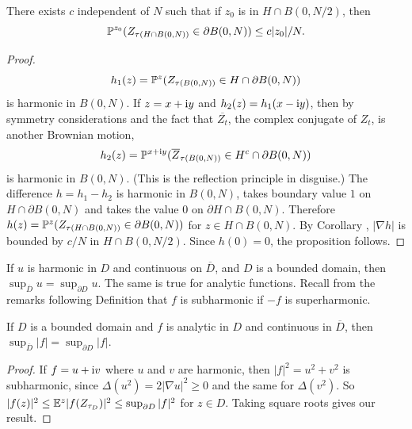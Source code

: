 \begin{proposition}\label{prop:ch5_1.5}
There exists $c$ independent of $N$ such that if $z_0$ is in $H \cap B(0,N/2)$, then
\[
    \P^{z_0}(Z_{\tau(H \cap B(0,N))} \in \partial B(0,N)) \leq c|z_0|/N.
\]
\end{proposition}

\begin{proof}
\[
    h_1(z) = \P^z(Z_{\tau(B(0,N))} \in H \cap \partial B(0,N))
\]
is harmonic in $B(0,N)$. If $z = x + \im y$ and $h_2(z) = h_1(x-\im y)$, then by symmetry considerations and the fact that $\overline{Z_t}$, the complex conjugate of $Z_t$, is another Brownian motion,
\[
    h_2(z) = \P^{x+\im y}(\overline{Z}_{\tau(B(0,N))} \in H^c \cap \partial B(0,N))
\]
is harmonic in $B(0,N)$. (This is the reflection principle in disguise.) The difference $h = h_1 - h_2$ is harmonic in $B(0,N)$, takes boundary value $1$ on $H \cap \partial B(0,N)$ and takes the value $0$ on $\partial H \cap B(0,N)$. Therefore $h(z) = \P^z(Z_{\tau(H \cap B(0,N))} \in \partial B(0,N))$ for $z \in H \cap B(0,N)$. By Corollary , $|\nabla h|$ is bounded by $c/N$ in $H \cap B(0,N/2)$. Since $h(0) = 0$, the proposition follows.
\end{proof}



If $u$ is harmonic in $D$ and continuous on $\overline{D}$, and $D$ is a bounded domain, then $\sup_{\overline{D}} u = \sup_{\partial D} u$. The same is true for analytic functions. Recall from the remarks following Definition  that $f$ is subharmonic if $-f$ is superharmonic.

\begin{proposition}\label{prop:ch5_1.6}
If $D$ is a bounded domain and $f$ is analytic in $D$ and continuous in $\overline{D}$, then $\sup_{\overline{D}} |f| = \sup_{\partial D} |f|$.
\end{proposition}

\begin{proof}
If $f = u + \im v$ where $u$ and $v$ are harmonic, then $|f|^2 = u^2 + v^2$ is subharmonic, since $\Delta(u^2) = 2|\nabla u|^2 \geq 0$ and the same for $\Delta(v^2)$. So $|f(z)|^2 \leq \E^z|f(Z_{\tau_D})|^2 \leq \sup_{\partial D} |f|^2$ for $z \in D$. Taking square roots gives our result.
\end{proof}

